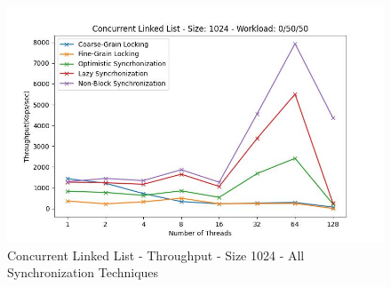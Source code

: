 \documentclass[../final_report.tex]{subfiles}
\begin{document}
\begin{figure}[H]
        \includegraphics[scale=0.4]{outFiles/plots/concurrent_data_structs_all_1024_0_50_50.jpg}
    \caption{Concurrent Linked List - Throughput - Size 1024 - All Synchronization Techniques}
    \label{fig:Concurrent Linked List - Throughput - Size 1024 - All Synchronization Techniques}
\end{figure}
\end{document}
